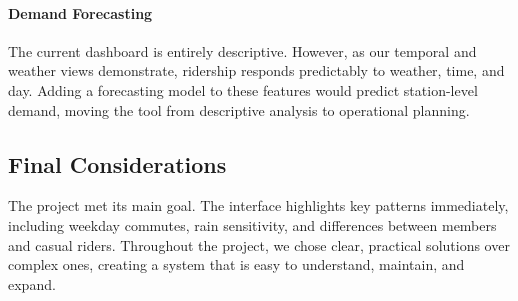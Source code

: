 \paragraph{Demand Forecasting}
The current dashboard is entirely descriptive.
However, as our temporal and weather views demonstrate, ridership responds predictably to weather, time, and day.
Adding a forecasting model to these features would predict station-level demand, moving the tool from descriptive analysis to operational planning.

\subsection{Final Considerations}
The project met its main goal.
The interface highlights key patterns immediately, including weekday commutes, rain sensitivity, and differences between members and casual riders.
Throughout the project, we chose clear, practical solutions over complex ones, creating a system that is easy to understand, maintain, and expand.